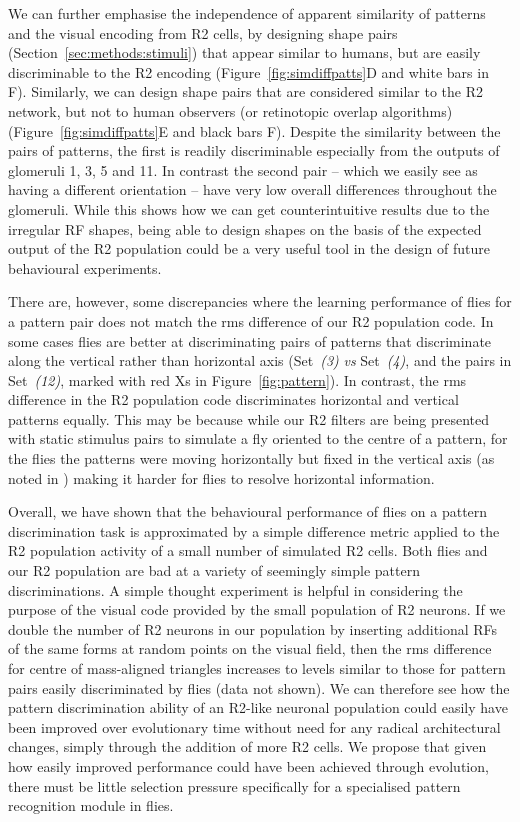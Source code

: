 We can further emphasise the independence of apparent similarity of patterns and the visual encoding from R2 cells, by designing shape pairs (Section~\ref{sec:methods:stimuli}) that appear similar to humans, but are easily discriminable to the R2 encoding (Figure~\ref{fig:simdiffpatts}D and white bars in F). Similarly, we can design shape pairs that are considered similar to the R2 network, but not to human observers (or retinotopic overlap algorithms) (Figure~\ref{fig:simdiffpatts}E and black bars F). Despite the similarity between the pairs of patterns, the first is readily discriminable especially from the outputs of glomeruli 1, 3, 5 and 11. In contrast the second pair -- which we easily see as having a different orientation -- have very low overall differences throughout the glomeruli. While this shows how we can get counterintuitive results due to the irregular RF shapes, being able to design shapes on the basis of the expected output of the R2 population could be a very useful tool in the design of future behavioural experiments.

There are, however, some discrepancies where the learning performance of flies for a pattern pair does not match the \ac{rms} difference of our R2 population code. In some cases flies are better at discriminating pairs of patterns that discriminate along the vertical rather than horizontal axis (Set~\emph{(3)} \emph{vs} Set~\emph{(4)}, and the pairs in Set~\emph{(12)}, marked with red Xs in Figure~\ref{fig:pattern}). In contrast, the \ac{rms} difference in the R2 population code discriminates horizontal and vertical patterns equally. This may be because while our R2 filters are being presented with static stimulus pairs to simulate a fly oriented to the centre of a pattern, for the flies the patterns were moving horizontally but fixed in the vertical axis (as noted in \cite{Ernst1999}) making it harder for flies to resolve horizontal information.

Overall, we have shown that the behavioural performance of flies on a pattern discrimination task is approximated by a simple difference metric applied to the R2 population activity of a small number of simulated R2 cells. Both flies and our R2 population are bad at a variety of seemingly simple pattern discriminations. A simple thought experiment is helpful in considering the purpose of the visual code provided by the small population of R2 neurons. If we double the number of R2 neurons in our population by inserting additional RFs of the same forms at random points on the visual field, then the \ac{rms} difference for centre of mass-aligned triangles increases to levels similar to those for pattern pairs easily discriminated by flies (data not shown). We can therefore see how the pattern discrimination ability of an R2-like neuronal population could easily have been improved over evolutionary time without need for any radical architectural changes, simply through the addition of more R2 cells. We propose that given how easily improved performance could have been achieved through evolution, there must be little selection pressure specifically for a specialised pattern recognition module in flies.

